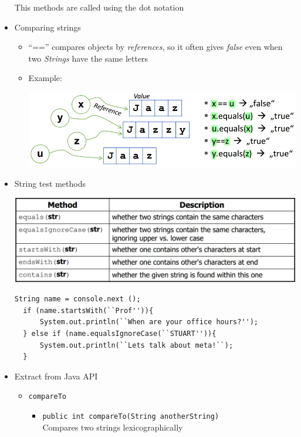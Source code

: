 \documentclass[a4paper]{article}
\newcommand{\inline}[1]{\lstinline!#1!}%
\begin{document}
\begin{itemize}
\begin{center}
      \end{center}
      This methods are called using the dot notation
  \item Comparing strings
    \begin{itemize}
      \item ``=='' compares objects by \textit{references}, so it often gives \textit{false} even when two \textit{Strings} have the same letters
      \item Example:\\
      \begin{center}
        \includegraphics[scale=1.2]{Figures/StringExample.jpg}
      \end{center}
    \end{itemize}
  \item String test methods
    \begin{center}
      \includegraphics[scale=1]{Figures/StringTestMethods.jpg}
    \end{center}
  \begin{lstlisting}
String name = console.next ();
  if (name.startsWith(``Prof'')){
      System.out.println(``When are your office hours?'');
  } else if (name.equalsIgnoreCase(``STUART'')){
      System.out.println(``Lets talk about meta!``);
  }
  \end{lstlisting}
  \item Extract from Java API
    \begin{itemize}
      \item \inline{compareTo}
        \begin{itemize}
          \item \inline{public int compareTo(String anotherString)}\\Compares two strings lexicographically

\end{itemize}
\end{itemize}
\end{itemize}
\end{document}
